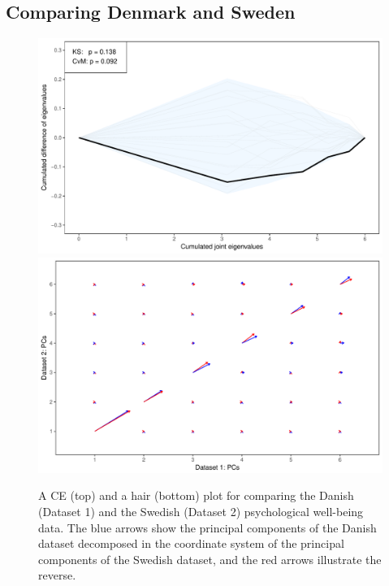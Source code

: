 \documentclass[titlepage,11pt,twoside]{article}
\begin{document}
{\subsection{Comparing Denmark and Sweden}
\begin{figure}
\center
\includegraphics[scale = 0.7]{essDKSEce.pdf}
\includegraphics[scale = 0.7]{essDKSEhair.pdf}
\caption{A CE (top) and a hair (bottom) plot for comparing the Danish (Dataset 1) and the Swedish (Dataset 2) psychological well-being data. The blue arrows show the principal components of the Danish dataset decomposed in the coordinate system of the principal components of the Swedish dataset, and the red arrows illustrate the reverse.}
\label{plotSE.cehair}
\end{figure}

}
\end{document}
